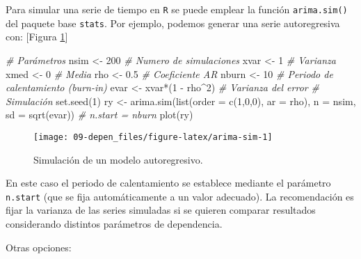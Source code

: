 \documentclass[
]{book}
\newenvironment{Shaded}{\begin{snugshade}}{\end{snugshade}}
\newcommand{\AttributeTok}[1]{\textcolor[rgb]{0.77,0.63,0.00}{#1}}
\newcommand{\CommentTok}[1]{\textcolor[rgb]{0.56,0.35,0.01}{\textit{#1}}}
\newcommand{\DecValTok}[1]{\textcolor[rgb]{0.00,0.00,0.81}{#1}}
\newcommand{\FloatTok}[1]{\textcolor[rgb]{0.00,0.00,0.81}{#1}}
\newcommand{\FunctionTok}[1]{\textcolor[rgb]{0.00,0.00,0.00}{#1}}
\newcommand{\NormalTok}[1]{#1}
\newcommand{\OtherTok}[1]{\textcolor[rgb]{0.56,0.35,0.01}{#1}}
\newcommand{\SpecialCharTok}[1]{\textcolor[rgb]{0.00,0.00,0.00}{#1}}
\theoremstyle{break}
\theoremstyle{definition}
\theoremstyle{definition}
\theoremstyle{definition}
\theoremstyle{definition}
\theoremstyle{remark}
\begin{document}
Para simular una serie de tiempo en \texttt{R}
se puede emplear la función \texttt{arima.sim()} del paquete base \texttt{stats}.
Por ejemplo, podemos generar una serie autoregresiva con:
{[}Figura \ref{fig:arima-sim}{]}

\begin{Shaded}
\begin{Highlighting}[]
\CommentTok{\# Parámetros}
\NormalTok{nsim }\OtherTok{\textless{}{-}} \DecValTok{200}   \CommentTok{\# Numero de simulaciones}
\NormalTok{xvar }\OtherTok{\textless{}{-}} \DecValTok{1}     \CommentTok{\# Varianza}
\NormalTok{xmed }\OtherTok{\textless{}{-}} \DecValTok{0}     \CommentTok{\# Media}
\NormalTok{rho }\OtherTok{\textless{}{-}} \FloatTok{0.5}    \CommentTok{\# Coeficiente AR}
\NormalTok{nburn }\OtherTok{\textless{}{-}} \DecValTok{10}   \CommentTok{\# Periodo de calentamiento (burn{-}in)}
\NormalTok{evar }\OtherTok{\textless{}{-}}\NormalTok{ xvar}\SpecialCharTok{*}\NormalTok{(}\DecValTok{1} \SpecialCharTok{{-}}\NormalTok{ rho}\SpecialCharTok{\^{}}\DecValTok{2}\NormalTok{) }\CommentTok{\# Varianza del error}
\CommentTok{\# Simulación}
\FunctionTok{set.seed}\NormalTok{(}\DecValTok{1}\NormalTok{)}
\NormalTok{ry }\OtherTok{\textless{}{-}} \FunctionTok{arima.sim}\NormalTok{(}\FunctionTok{list}\NormalTok{(}\AttributeTok{order =} \FunctionTok{c}\NormalTok{(}\DecValTok{1}\NormalTok{,}\DecValTok{0}\NormalTok{,}\DecValTok{0}\NormalTok{), }\AttributeTok{ar =}\NormalTok{ rho), }
            \AttributeTok{n =}\NormalTok{ nsim, }\AttributeTok{sd =} \FunctionTok{sqrt}\NormalTok{(evar)) }\CommentTok{\# n.start = nburn}
\FunctionTok{plot}\NormalTok{(ry)}
\end{Highlighting}
\end{Shaded}

\begin{figure}[!htb]

{\centering \texttt{[image: 09-depen\_files/figure-latex/arima-sim-1]} 

}

\caption{Simulación de un modelo autoregresivo.}\label{fig:arima-sim}
\end{figure}

En este caso el periodo de calentamiento se establece mediante el
parámetro \texttt{n.start} (que se fija automáticamente a un valor adecuado).
La recomendación es fijar la varianza de las series simuladas si se quieren
comparar resultados considerando distintos parámetros de dependencia.

Otras opciones:
\end{document}
